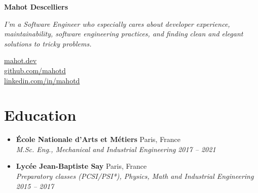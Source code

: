 \documentclass[a4paper,11pt]{article}
\newcommand{\entry}[4]{%
\item \textbf{#1} \hfill #2 \\
\textit{\small #3} \hfill \textit{\small #4}}
\newenvironment{entries}{
\begin{itemize}[leftmargin=1.2em, itemsep=4pt, parsep=0pt, topsep=0pt]}{
\end{itemize}}
\begin{document}
\begin{minipage}[t]{0.58\textwidth}
  {\LARGE\textbf{Mahot Descelliers}} \\[4pt]
  \raggedright
  \small\textit{I'm a Software Engineer who especially cares about developer experience,
    maintainability, software engineering practices, and finding clean and elegant solutions
  to tricky problems.}
\end{minipage}%
\hfill
\begin{minipage}[t]{0.4\textwidth}
  \raggedleft
  \href{https://mahot.dev}{mahot.dev} \\
  \href{https://github.com/mahotd}{github.com/mahotd} \\
  \href{https://www.linkedin.com/in/mahotd/}{linkedin.com/in/mahotd}
\end{minipage}

\section{Education}
\begin{entries}
  \entry{École Nationale d'Arts et Métiers}{Paris, France}{M.Sc. Eng., Mechanical and
  Industrial Engineering}{2017 -- 2021}
  \entry{Lycée Jean-Baptiste Say}{Paris, France}{Preparatory classes (PCSI/PSI*),
  Physics, Math and Industrial Engineering}{2015 -- 2017}
\end{entries}
\end{document}
